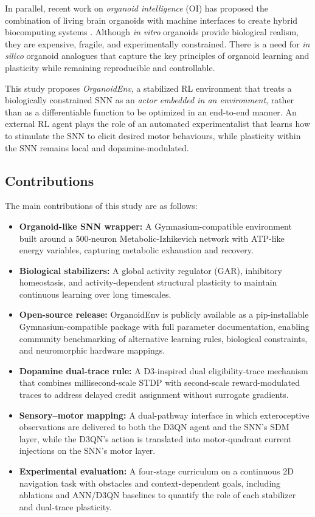 \documentclass[journal,twocolumn]{IEEEtran}
\begin{document}
In parallel, recent work on \emph{organoid intelligence} (OI) has
proposed the combination of living brain organoids with machine
interfaces to create hybrid biocomputing systems
\cite{Smirnova2023OI,Hartung2023OIworkshop}.  Although \emph{in
vitro} organoids provide biological realism, they are expensive,
fragile, and experimentally constrained.  There is a need for
\emph{in silico} organoid analogues that capture the key principles
of organoid learning and plasticity while remaining reproducible and
controllable.

This study proposes \emph{OrganoidEnv}, a stabilized RL environment
that treats a biologically constrained SNN as an \emph{actor embedded
in an environment}, rather than as a differentiable function to be
optimized in an end-to-end manner.  An external RL agent plays the
role of an automated experimentalist that learns how to stimulate the
SNN to elicit desired motor behaviours, while plasticity within the
SNN remains local and dopamine-modulated.

\subsection{Contributions}

The main contributions of this study are as follows:

\begin{itemize}
\item \textbf{Organoid-like SNN wrapper:} A Gymnasium-compatible
      environment built around a 500-neuron Metabolic-Izhikevich
      network with ATP-like energy variables, capturing metabolic
      exhaustion and recovery.
\item \textbf{Biological stabilizers:} A global activity regulator
      (GAR), inhibitory homeostasis, and activity-dependent structural
      plasticity to maintain continuous learning over long timescales.
\item \textbf{Open-source release:} OrganoidEnv is publicly available as a 
      pip-installable Gymnasium-compatible package with full parameter 
      documentation, enabling community benchmarking of alternative learning 
      rules, biological constraints, and neuromorphic hardware mappings.
\item \textbf{Dopamine dual-trace rule:} A D3-inspired dual
      eligibility-trace mechanism that combines millisecond-scale STDP
      with second-scale reward-modulated traces to address delayed
      credit assignment without surrogate gradients.
\item \textbf{Sensory--motor mapping:} A dual-pathway interface in
      which exteroceptive observations are delivered to both the D3QN
      agent and the SNN's SDM layer, while the D3QN's action is
      translated into motor-quadrant current injections on the SNN's
      motor layer.
\item \textbf{Experimental evaluation:} A four-stage curriculum on a
      continuous 2D navigation task with obstacles and context-dependent
      goals, including ablations and ANN/D3QN baselines to quantify the
      role of each stabilizer and dual-trace plasticity.
\end{itemize}
\end{document}
